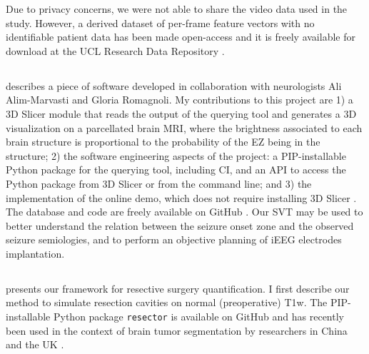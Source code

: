 Due to privacy concerns, we were not able to share the video data used in the study.
However, a derived dataset of per-frame feature vectors with no identifiable patient data has been made open-access and it is freely available for download at the UCL Research Data Repository \cite{perez-garcia_data_2021}.



\subsection{}

 describes a piece of software developed in collaboration with neurologists Ali Alim-Marvasti and Gloria Romagnoli.
My contributions to this project are 1) a 3D Slicer module \cite{fedorov_3d_2012} that reads the output of the querying tool and generates a 3D visualization on a parcellated brain \ac{MRI}, where the brightness associated to each brain structure is proportional to the probability of the \ac{EZ} being in the structure; 2) the software engineering aspects of the project: a \ac{PIP}-installable Python package for the querying tool, including \ac{CI}, and an \ac{API} to access the Python package from 3D Slicer or from the command line; and 3) the implementation of the online demo, which does not require installing 3D Slicer%
.
The database and code are freely available on GitHub%
\fnurl{\svtgithub}.
Our \ac{SVT} may be used to better understand the relation between the seizure onset zone and the observed seizure semiologies, and to perform an objective planning of \ac{iEEG} electrodes implantation.


\subsection{}

 presents our framework for resective surgery quantification.
I first describe our method to simulate resection cavities on normal (preoperative) \ac{T1w}.
The \ac{PIP}-installable Python package \texttt{resector} is available on GitHub%
and has recently been used in the context of brain tumor segmentation by researchers in China and the UK \cite{zhang_self-supervised_2021}.

